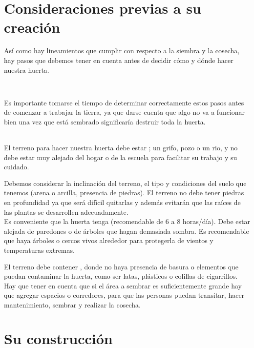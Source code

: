 \documentclass[../main.tex]{subfiles}
\begin{document}
\section{Consideraciones previas a su creación}

Así como hay lineamientos que cumplir con respecto a la siembra y la cosecha, hay pasos que debemos tener en cuenta antes de decidir cómo y dónde hacer nuestra huerta.

\hfill\\

\begin{recuadroR}
    Es importante tomarse el tiempo de determinar correctamente estos pasos antes de comenzar a trabajar la tierra, ya que darse cuenta que algo no va a funcionar bien una vez que está sembrado significaría destruir toda la huerta.
\end{recuadroR}

\hfill\\

El terreno para hacer nuestra huerta debe estar ; un grifo, pozo o un rio, y no debe estar muy alejado del hogar o de la escuela para facilitar su trabajo y su cuidado. 

Debemos considerar la inclinación del terreno, el tipo y condiciones del suelo que tenemos (arena o arcilla, presencia de piedras). El terreno no debe tener piedras en profundidad ya que será difícil quitarlas y además evitarán que las raíces de las plantas se desarrollen adecuadamente. \\

Es conveniente que la huerta tenga  (recomendable de 6 a 8 horas/día). Debe  estar alejada de paredones o de árboles que hagan demasiada sombra. Es recomendable que haya árboles o cercos vivos alrededor para protegerla de vientos y temperaturas extremas.

El terreno debe contener , donde no haya presencia de basura o elementos que puedan contaminar la huerta, como ser latas, plásticos o colillas de cigarrillos. \\

Hay que tener en cuenta que si el área a sembrar es suficientemente grande hay que agregar espacios o corredores, para que las personas puedan transitar, hacer mantenimiento, sembrar y realizar la cosecha.


\section{Su construcción}
\end{document}
